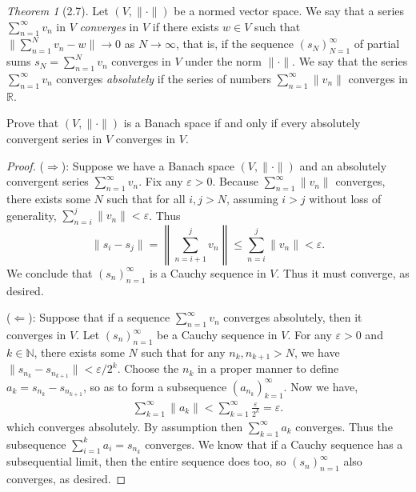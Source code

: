 \documentclass[12pt]{article}
\theoremstyle{remark}
\theoremstyle{named}
\newtheorem*{theorem}{Theorem}
\newcommand{\e}{\varepsilon}
\newcommand{\N}{\mathbb N}
\newcommand{\R}{\mathbb R}
\begin{document}
\begin{theorem}[2.7]
    Let \((V, \|\cdot\|)\) be a normed vector space. We say that a series \(\sum_{n = 1}^\infty v_n\) in \(V\) \textit{converges} in \(V\) if there exists \(w \in V\) such that \(\|\sum_{n = 1}^N v_n - w\| \to 0\) as \(N \to \infty\), that is, if the sequence \((s_N)_{N = 1}^\infty\) of partial sums \(s_N = \sum_{n = 1}^N v_n\) converges in \(V\) under the norm \(\|\cdot\|\). We say that the series \(\sum_{n = 1}^\infty v_n\) converges \textit{absolutely} if the series of numbers \(\sum_{n = 1}^{\infty}\|v_n\|\) converges in \(\R\).

    Prove that \((V, \|\cdot\|)\) is a Banach space if and only if every absolutely convergent series in \(V\) converges in \(V\).
\end{theorem}

\begin{proof}
    (\(\Rightarrow\)): Suppose we have a Banach space \((V, \|\cdot\|)\) and an absolutely convergent series \(\sum_{n = 1}^\infty v_n\). Fix any \(\e > 0\). Because \(\sum_{n = 1}^{\infty} \|v_n\|\) converges, there exists some \(N\) such that for all \(i, j > N\), assuming \(i > j\) without loss of generality, \(\sum_{n = i}^{j} \|v_n\| < \e\). Thus 
    \[\|s_i - s_j\| = \left \| \sum_{n = i + 1}^{j} v_n \right \| \leq \sum_{n = i}^{j} \|v_n\| < \e.\]
    We conclude that \((s_n)_{n = 1}^\infty\) is a Cauchy sequence in \(V\). Thus it must converge, as desired.

    (\(\Leftarrow\)): Suppose that if a sequence \(\sum_{n = 1}^{\infty} v_n\) converges absolutely, then it converges in \(V\). Let \((s_n)_{n = 1}^\infty\) be a Cauchy sequence in \(V\). For any \(\e > 0\) and \(k \in \N\), there exists some \(N\) such that for any \(n_k, n_{k + 1} > N\), we have \(\|s_{n_k} - s_{n_{k+1}}\| < \e / 2^k\). Choose the \(n_k\) in a proper manner to define \(a_k = s_{n_k} - s_{n_{k + 1}}\), so as to form a subsequence \((a_{n_k})_{k = 1}^\infty\). Now we have, 
    \begin{align*}
        \sum_{k = 1}^{\infty} \|a_k\| < \sum_{k = 1}^{\infty} \frac{\e}{2^k} = \e.
    \end{align*}
    which converges absolutely. By assumption then \(\sum_{k = 1}^{\infty} a_k\) converges. Thus the subsequence \(\sum_{i = 1}^{k} a_i = s_{n_k}\) converges. We know that if a Cauchy sequence has a subsequential limit, then the entire sequence does too, so \((s_n)_{n = 1}^\infty\) also converges, as desired.
\end{proof}
\end{document}
